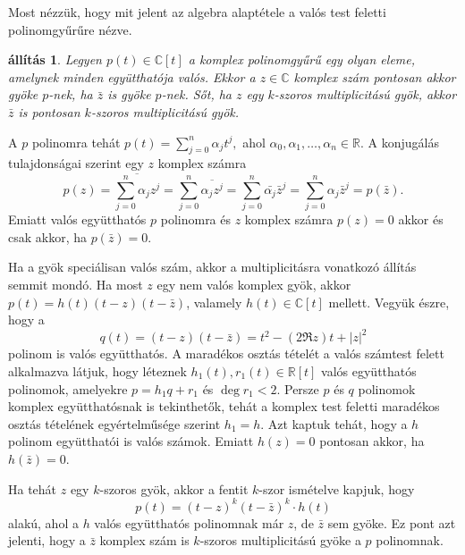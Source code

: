 \documentclass[a4paper, showtrims]{memoir}
\makeatletter
\renewenvironment{proof}[1][\proofname]
    {\par\pushQED{\qed}%
    \normalfont \topsep6\p@\@plus6\p@\relax
    \trivlist
    \item[\hskip\labelsep
        \itshape
    #1\@addpunct{:}]\ignorespaces}
    {\popQED\endtrivlist\@endpefalse}
\theoremstyle{plain}
\newtheorem{proposition}{állítás}[chapter]
\theoremstyle{remark}
\theoremstyle{definition}
\makeatother
\begin{document}
Most nézzük, hogy mit jelent az algebra alaptétele a valós test feletti polinomgyűrűre nézve.
\begin{proposition}
	Legyen $p\left( t \right)\in\mathbb{C}[t]$ a komplex polinomgyűrű egy olyan eleme,
	amelynek minden együtthatója valós.
	Ekkor a $z\in \mathbb{C}$ komplex szám pontosan akkor gyöke $p$-nek,
	ha $\bar{z}$ is gyöke $p$-nek.
	Sőt, ha $z$ egy $k$-szoros multiplicitású gyök,
	akkor $\bar{z}$ is pontosan $k$-szoros multiplicitású gyök.
\end{proposition}
\begin{proof}
	A $p$ polinomra tehát
	\begin{math}
		p\left( t \right)
		=
		\sum_{j=0}^n\alpha_jt^j,
	\end{math}
	ahol $\alpha_0,\alpha_1,\ldots,\alpha_n\in\mathbb{R}$.
	A konjugálás tulajdonságai szerint egy $z$ komplex számra
	\[
		p\left( z \right)=
		\overline{
			\sum_{j=0}^n\alpha_jz^j
		}
		=
		\sum_{j=0}^n\overline{\alpha_jz^j}
		=
		\sum_{j=0}^n\bar{\alpha_j}\bar{z}^j
		=
		\sum_{j=0}^n\alpha_j\bar{z}^j
		=
		p\left(\bar{z} \right).
	\]
	Emiatt valós együtthatós $p$ polinomra és $z$ komplex számra
	$p\left( z \right)=0$ akkor és csak akkor, ha $p\left( \bar{z} \right)=0.$

	Ha a gyök speciálisan valós szám, akkor a multiplicitásra vonatkozó állítás semmit mondó.
	Ha most $z$ egy nem valós komplex gyök,
	akkor $p(t)=h\left( t \right)\left( t-z \right)\left( t-\bar{z} \right)$, valamely
    $h(t)\in\mathbb{C}\left[ t \right]$ mellett.
    Vegyük észre, hogy a 
    \[
        q\left( t \right)
        =
        \left( t-z \right)\left( t-\bar{z} \right)
        =
        t^2-\left( 2\Re z \right)t+|z|^2
    \]
    polinom is valós együtthatós.
    A maradékos osztás tételét a valós számtest felett alkalmazva látjuk, hogy léteznek 
    $h_1(t),r_1(t)\in\mathbb{R}\left[ t \right]$ valós együtthatós polinomok, 
    amelyekre $p=h_1q+r_1$ és $\deg r_1<2$. 
    Persze $p$ és $q$ polinomok komplex együtthatósnak is tekinthetők,
    tehát a komplex test feletti maradékos osztás tételének egyértelműsége szerint
    $h_1=h$.
    Azt kaptuk tehát, hogy a $h$ polinom együtthatói is valós számok.
    Emiatt
	$h\left( z \right)=0$ pontosan akkor, ha $h\left( \bar{z} \right)=0$.
	
    Ha tehát $z$ egy $k$-szoros gyök, akkor a fentit $k$-szor ismételve
	kapjuk, hogy
	\[
		p\left( t \right)=\left( t-z \right)^{k}\left( t-\bar{z} \right)^{k}\cdot h\left( t \right)
	\]
	alakú, ahol a $h$ valós együtthatós polinomnak már $z$, de  $\bar{z}$ sem gyöke.
    Ez pont azt jelenti, hogy a $\bar{z}$ komplex szám is $k$-szoros multiplicitású gyöke a $p$ polinomnak.
\end{proof}
\end{document}
